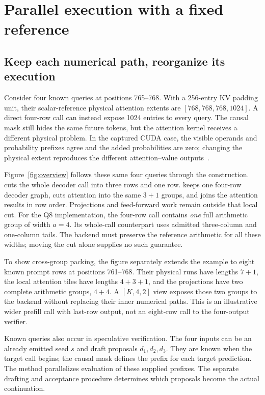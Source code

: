 \section{Parallel execution with a fixed reference}
\label{sec:method}

\subsection{Keep each numerical path, reorganize its execution}
Consider four known queries at positions 765--768. With a 256-entry KV padding unit, their scalar-reference physical attention extents are $[768,768,768,1024]$. A direct four-row call can instead expose 1024 entries to every query. The causal mask still hides the same future tokens, but the attention kernel receives a different physical problem. In the captured CUDA case, the visible operands and probability prefixes agree and the added probabilities are zero; changing the physical extent reproduces the different attention--value outputs~\cite{records}.

Figure~\ref{fig:overview} follows these same four queries through the construction. \Simple{} cuts the whole decoder call into three rows and one row. \Local{} keeps one four-row decoder graph, cuts attention into the same $3+1$ groups, and joins the attention results in row order. Projections and feed-forward work remain outside that local cut. For the Q8 implementation, the four-row call contains \emph{one} full arithmetic group of width $a=4$. Its whole-call counterpart uses admitted three-column and one-column tails. The backend must preserve the reference arithmetic for all these widths; moving the cut alone supplies no such guarantee.

To show cross-group packing, the figure separately extends the example to eight known prompt rows at positions 761--768. Their physical runs have lengths $7+1$, the local attention tiles have lengths $4+3+1$, and the projections have two complete arithmetic groups, $4+4$. A $[K,4,2]$ view exposes those two groups to the backend without replacing their inner numerical paths. This is an illustrative wider prefill call with last-row output, not an eight-row call to the four-output verifier.

Known queries also occur in speculative verification. The four inputs can be an already emitted seed $s$ and draft proposals $d_1,d_2,d_3$. They are known when the target call begins; the causal mask defines the prefix for each target prediction. The method parallelizes evaluation of these supplied prefixes. The separate drafting and acceptance procedure determines which proposals become the actual continuation.

